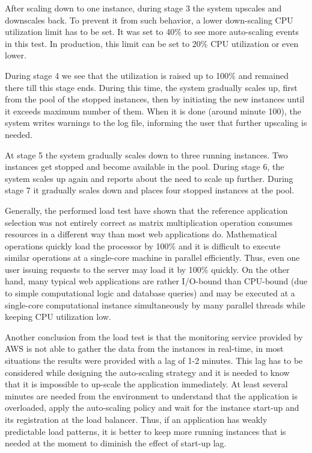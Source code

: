 \documentclass[conference]{IEEEtran}
\begin{document}
After scaling down to one instance, during stage 3 the system upscales and downscales back. To prevent it from such behavior, a lower down-scaling CPU utilization limit has to be set. It was set to 40\% to see more auto-scaling events in this test. In production, this limit can be set to 20\% CPU utilization or even lower.

During stage 4 we see that the utilization is raised up to 100\% and remained there till this stage ends. During this time, the system gradually scales up, first from the pool of the stopped instances, then by initiating the new instances until it exceeds maximum number of them. When it is done (around minute 100), the system writes warnings to the log file, informing the user that further upscaling is needed.

At stage 5 the system gradually scales down to three running instances. Two instances get stopped and become available in the pool. During stage 6, the system scales up again and reports about the need to scale up further. During stage 7 it gradually scales down and places four stopped instances at the pool. 

Generally, the performed load test have shown that the reference application selection was not entirely correct as matrix multiplication operation consumes resources in a different way than most web applications do. Mathematical operations quickly load the processor by 100\% and it is difficult to execute similar operations at a single-core machine in parallel efficiently. Thus, even one user issuing requests to the server may load it by 100\% quickly. On the other hand, many typical web applications are rather I/O-bound than CPU-bound (due to simple computational logic and database queries) and may be executed at a single-core computational instance simultaneously by many parallel threads while keeping CPU utilization low.

Another conclusion from the load test is that the monitoring service provided by AWS is not able to gather the data from the instances in real-time, in most situations the results were provided with a lag of 1-2 minutes. This lag has to be considered while designing the auto-scaling strategy and it is needed to know that it is impossible to up-scale the application immediately. At least several minutes are needed from the environment to understand that the application is overloaded, apply the auto-scaling policy and wait for the instance start-up and its registration at the load balancer. Thus, if an application has weakly predictable load patterns, it is better to keep more running instances that is needed at the moment to diminish the effect of start-up lag.
\end{document}
